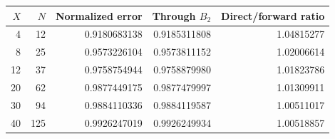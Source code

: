 \begin{tabular}{rrrrr}
\toprule
$X$ & $N$ & Normalized error & Through $B_2$ & Direct/forward ratio\\
\midrule
4 & 12 & 0.9180683138 & 0.9185311808 & 1.04815277\\
8 & 25 & 0.9573226104 & 0.9573811152 & 1.02006614\\
12 & 37 & 0.9758754944 & 0.9758879980 & 1.01823786\\
20 & 62 & 0.9877449175 & 0.9877479997 & 1.01309911\\
30 & 94 & 0.9884110336 & 0.9884119587 & 1.00511017\\
40 & 125 & 0.9926247019 & 0.9926249934 & 1.00518857\\
\bottomrule
\end{tabular}
